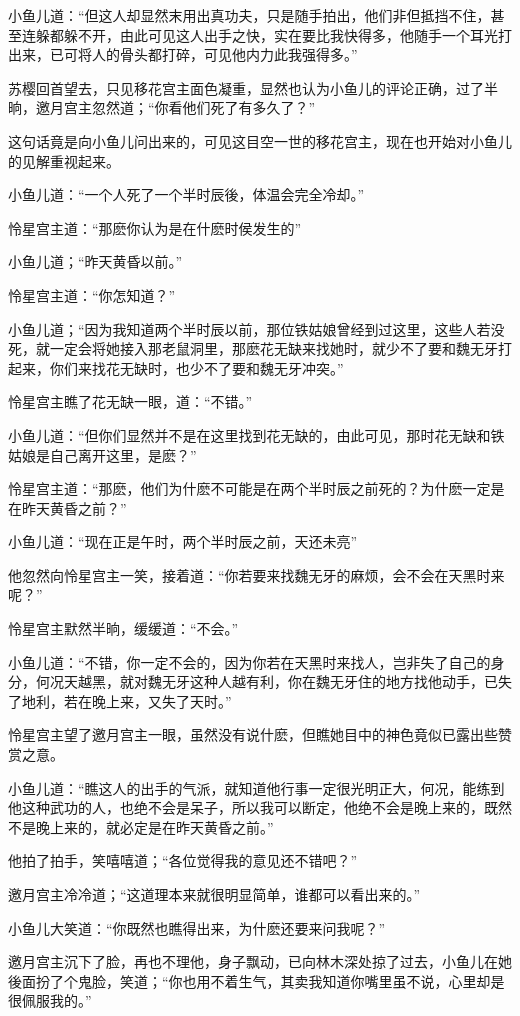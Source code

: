 \documentclass[12pt,oneside]{book}
\begin{document}
小鱼儿道：``但这人却显然末用出真功夫，只是随手拍出，他们非但抵挡不住，甚至连躲都躲不开，由此可见这人出手之快，实在要比我快得多，他随手一个耳光打出来，已可将人的骨头都打碎，可见他内力此我强得多。''

苏樱回首望去，只见移花宫主面色凝重，显然也认为小鱼儿的评论正确，过了半晌，邀月宫主忽然道；``你看他们死了有多久了？''

这句话竟是向小鱼儿问出来的，可见这目空一世的移花宫主，现在也开始对小鱼儿的见解重视起来。

小鱼儿道：``一个人死了一个半时辰後，体温会完全冷却。''

怜星宫主道：``那麽你认为是在什麽时侯发生的''

小鱼儿道；``昨天黄昏以前。''

怜星宫主道：``你怎知道？''

小鱼儿道；``因为我知道两个半时辰以前，那位铁姑娘曾经到过这里，这些人若没死，就一定会将她接入那老鼠洞里，那麽花无缺来找她时，就少不了要和魏无牙打起来，你们来找花无缺时，也少不了要和魏无牙冲突。''

怜星宫主瞧了花无缺一眼，道：``不错。''

小鱼儿道：``但你们显然并不是在这里找到花无缺的，由此可见，那时花无缺和铁姑娘是自己离开这里，是麽？''

怜星宫主道：``那麽，他们为什麽不可能是在两个半时辰之前死的？为什麽一定是在昨天黄昏之前？''

小鱼儿道：``现在正是午时，两个半时辰之前，天还未亮''

他忽然向怜星宫主一笑，接着道：``你若要来找魏无牙的麻烦，会不会在天黑时来呢？''

怜星宫主默然半晌，缓缓道：``不会。''

小鱼儿道：``不错，你一定不会的，因为你若在天黑时来找人，岂非失了自己的身分，何况天越黑，就对魏无牙这种人越有利，你在魏无牙住的地方找他动手，已失了地利，若在晚上来，又失了天时。''

怜星宫主望了邀月宫主一眼，虽然没有说什麽，但瞧她目中的神色竟似已露出些赞赏之意。

小鱼儿道：``瞧这人的出手的气派，就知道他行事一定很光明正大，何况，能练到他这种武功的人，也绝不会是呆子，所以我可以断定，他绝不会是晚上来的，既然不是晚上来的，就必定是在昨天黄昏之前。''

他拍了拍手，笑嘻嘻道；``各位觉得我的意见还不错吧？''

邀月宫主冷冷道；``这道理本来就很明显简单，谁都可以看出来的。''

小鱼儿大笑道：``你既然也瞧得出来，为什麽还要来问我呢？''

邀月宫主沉下了脸，再也不理他，身子飘动，已向林木深处掠了过去，小鱼儿在她後面扮了个鬼脸，笑道；``你也用不着生气，其卖我知道你嘴里虽不说，心里却是很佩服我的。''
\end{document}
